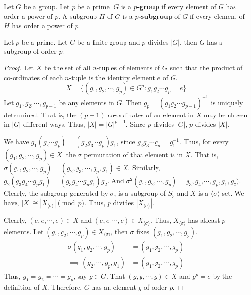 \begin{definition}
	Let $G$ be a group. Let $p$ be a prime. $G$ is a \textbf{$p$-group} if every element of $G$ has order a power of $p$.
	A subgroup $H$ of $G$ is a \textbf{$p$-subgroup} of $G$ if every element of $H$ has order a power of $p$.
\end{definition}
\begin{theorem}[Cauchy]
	Let $p$ be a prime.
	Let $G$ be a finite group and $p$ divides $|G|$, then $G$ has a subgroup of order $p$.
\end{theorem}
\begin{proof}
	Let $X$ be the set of all $n$-tuples of elements of $G$ such that the product of co-ordinates of each $n$-tuple is the identity element $e$ of $G$.
	\begin{equation}
	X = \{ (g_1,g_2,\cdots,g_p) \in G^p : g_1g_2\cdots g_p = e\}
	\end{equation}
	Let $g_1,g_2,\cdots,g_{p-1}$ be any elements in $G$.
	Then $g_p = (g_1g_2\cdots g_{p-1})^{-1}$ is uniquely determined.
	That is, the $(p-1)$ co-ordinates of an element in $X$ may be chosen in $|G|$ different ways.
	Thus, $|X| = |G|^{p-1}$.
	Since $p$ divides $|G|$, $p$ divides $|X|$.

	We have $g_1(g_2\cdots g_p) = (g_2g_3\cdots g_p)g_1$, since $g_2g_3\cdots g_p = g_1^{-1}$.
	Thus, for every $(g_1,g_2,\cdots,g_p) \in X$, the $\sigma$ permutation of that element is in $X$.
	That is, $\sigma(g_1,g_2,\cdots,g_p) = (g_2,g_3,\cdots,g_p,g_1) \in X$.
	Similarly, $g_2(g_3g_4\cdots g_pg_1) = (g_3g_4\cdots g_pg_1)g_2$.
	And $\sigma^2(g_1,g_2,\cdots,g_p) = g_3,g_4,\cdots,g_p,g_1,g_2)$.
	Clearly, the subgroup generated by $\sigma$, is a subgroup of $S_p$ and $X$ is a $\langle\sigma\rangle$-set.
	We have, $|X| \cong |X_{\langle\sigma\rangle}| \pmod{p}$.
	Thus, $p$ divides $|X_{\langle\sigma\rangle}|$.

	Clearly, $(e,e,\cdots,e) \in X$ and $(e,e,\cdots,e) \in X_{\langle\sigma\rangle}$.
	Thus, $X_{\langle\sigma\rangle}$ has atleast $p$ elements.
	Let $(g_1,g_2,\cdots,g_p) \in X_{\langle\sigma\rangle}$, then $\sigma$ fixes $(g_1,g_2,\cdots,g_p)$.
	\begin{align*}
		\sigma(g_1,g_2,\cdots,g_p) & = (g_1,g_2,\cdots,g_p)\\
		\implies (g_2,\cdots,g_p,g_1) & = (g_1,g_2,\cdots,g_p)
	\end{align*}
	Thus, $g_1 = g_2 = \cdots = g_p$, say $g \in G$.
	That $(g,g,\cdots,g) \in X$ and $g^p = e$ by the definition of $X$.
	Therefore, $G$ has an element $g$ of order $p$.
\end{proof}
